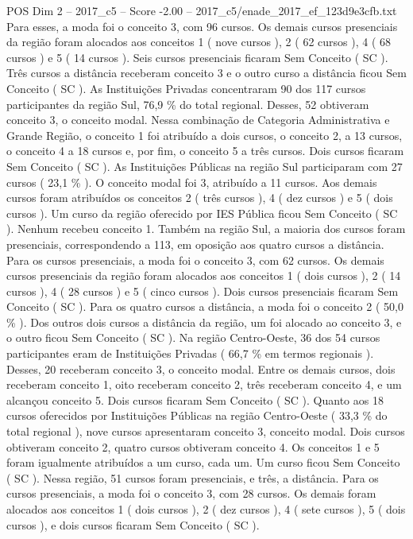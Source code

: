 \begin{textsample}{POS Dim 2 – 2017\_c5 – Score -2.00 – 2017\_c5/enade\_2017\_ef\_123d9e3cfb.txt}
Para esses, a moda foi o conceito 3, com 96 cursos.
Os demais cursos presenciais da região foram alocados aos conceitos 1 ( nove cursos ), 2 ( 62 cursos ), 4 ( 68 cursos ) e 5 ( 14 cursos ).
Seis cursos presenciais ficaram Sem Conceito ( SC ).
Três cursos a distância receberam conceito 3 e o outro curso a distância ficou Sem Conceito ( SC ).
As Instituições Privadas concentraram 90 dos 117 cursos participantes da região Sul, 76,9 \% do total regional.
Desses, 52 obtiveram conceito 3, o conceito modal.
Nessa combinação de Categoria Administrativa e Grande Região, o conceito 1 foi atribuído a dois cursos, o conceito 2, a 13 cursos, o conceito 4 a 18 cursos e, por fim, o conceito 5 a três cursos.
Dois cursos ficaram Sem Conceito ( SC ).
As Instituições Públicas na região Sul participaram com 27 cursos ( 23,1 \% ).
O conceito modal foi 3, atribuído a 11 cursos.
Aos demais cursos foram atribuídos os conceitos 2 ( três cursos ), 4 ( dez cursos ) e 5 ( dois cursos ).
Um curso da região oferecido por IES Pública ficou Sem Conceito ( SC ).
Nenhum recebeu conceito 1.
Também na região Sul, a maioria dos cursos foram presenciais, correspondendo a 113, em oposição aos quatro cursos a distância.
Para os cursos presenciais, a moda foi o conceito 3, com 62 cursos.
Os demais cursos presenciais da região foram alocados aos conceitos 1 ( dois cursos ), 2 ( 14 cursos ), 4 ( 28 cursos ) e 5 ( cinco cursos ).
Dois cursos presenciais ficaram Sem Conceito ( SC ).
Para os quatro cursos a distância, a moda foi o conceito 2 ( 50,0 \% ).
Dos outros dois cursos a distância da região, um foi alocado ao conceito 3, e o outro ficou Sem Conceito ( SC ).
Na região Centro-Oeste, 36 dos 54 cursos participantes eram de Instituições Privadas ( 66,7 \% em termos regionais ).
Desses, 20 receberam conceito 3, o conceito modal.
Entre os demais cursos, dois receberam conceito 1, oito receberam conceito 2, três receberam conceito 4, e um alcançou conceito 5.
Dois cursos ficaram Sem Conceito ( SC ).
Quanto aos 18 cursos oferecidos por Instituições Públicas na região Centro-Oeste ( 33,3 \% do total regional ), nove cursos apresentaram conceito 3, conceito modal.
Dois cursos obtiveram conceito 2, quatro cursos obtiveram conceito 4.
Os conceitos 1 e 5 foram igualmente atribuídos a um curso, cada um.
Um curso ficou Sem Conceito ( SC ).
Nessa região, 51 cursos foram presenciais, e três, a distância.
Para os cursos presenciais, a moda foi o conceito 3, com 28 cursos.
Os demais foram alocados aos conceitos 1 ( dois cursos ), 2 ( dez cursos ), 4 ( sete cursos ), 5 ( dois cursos ), e dois cursos ficaram Sem Conceito ( SC ).

\end{textsample}
